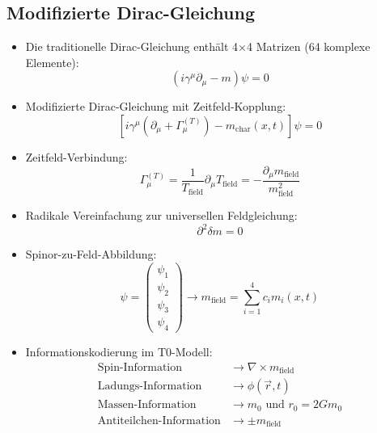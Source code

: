 \documentclass[12pt,a4paper]{article}
\begin{document}
	\subsection{Modifizierte Dirac-Gleichung}
	\begin{itemize}
		\item Die traditionelle Dirac-Gleichung enthält 4×4 Matrizen (64 komplexe Elemente):
		\begin{equation}
			\left(i\gamma^\mu \partial_\mu - m\right) \psi = 0
		\end{equation}
		
		\item Modifizierte Dirac-Gleichung mit Zeitfeld-Kopplung:
		\begin{equation}
			\boxed{\left[i\gamma^\mu\left(\partial_\mu + \Gamma_\mu^{(T)}\right) - m_{\text{char}}(x,t)\right]\psi = 0}
		\end{equation}
		
		\item Zeitfeld-Verbindung:
		\begin{equation}
			\Gamma_\mu^{(T)} = \frac{1}{T_{\text{field}}} \partial_\mu T_{\text{field}} = -\frac{\partial_\mu m_{\text{field}}}{m_{\text{field}}^2}
		\end{equation}
		
		\item Radikale Vereinfachung zur universellen Feldgleichung:
		\begin{equation}
			\boxed{\partial^2 \delta m = 0}
		\end{equation}
		
		\item Spinor-zu-Feld-Abbildung:
		\begin{equation}
			\psi = \begin{pmatrix} \psi_1 \\ \psi_2 \\ \psi_3 \\ \psi_4 \end{pmatrix} \rightarrow m_{\text{field}} = \sum_{i=1}^4 c_i m_i(x,t)
		\end{equation}
		
		\item Informationskodierung im T0-Modell:
		\begin{align}
			\text{Spin-Information} &\rightarrow \nabla \times m_{\text{field}} \\
			\text{Ladungs-Information} &\rightarrow \phi(\vec{r}, t) \\
			\text{Massen-Information} &\rightarrow m_0 \text{ und } r_0 = 2Gm_0 \\
			\text{Antiteilchen-Information} &\rightarrow \pm m_{\text{field}}
		\end{align}
	\end{itemize}
	
\end{document}
